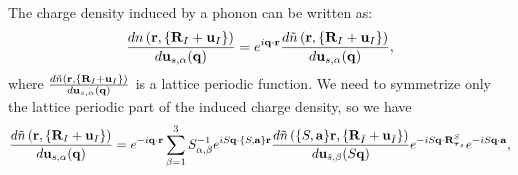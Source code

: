 \documentclass[12pt,a4paper,twoside]{report}
\begin{document}
The charge density induced by a phonon can be written as:
\begin{equation}
{d n\left({\bf r}, \{{\bf R}_I + {\bf u}_I\}\right)
\over d {\bf u}_{s,\alpha}({\bf q})} = 
e^{i {\bf q} \cdot {\bf r}} {d \tilde n\left({\bf r}, \{{\bf R}_I + {\bf u}_I\}\right)
\over d {\bf u}_{s,\alpha}({\bf q})},
\end{equation}
where ${d \tilde n\left({\bf r}, \{{\bf R}_I + {\bf u}_I\}\right)
\over d {\bf u}_{s,\alpha}({\bf q})}$ is a lattice periodic function.
We need to symmetrize only the lattice periodic
part of the induced charge density, so we have
\begin{equation}
{d \tilde n\left({\bf r}, \{{\bf R}_I + {\bf u}_I\}\right)
\over d {\bf u}_{s,\alpha}({\bf q})} = e^{-i{\bf q \cdot {\bf r }}} \sum_{\beta=1}^3 S^{-1}_{\alpha,\beta} 
e^{i S {\bf q} \cdot \{S,{\bf a}\} {\bf r }}
{d \tilde n\left(\{S,{\bf a}\} {\bf r}, \{{\bf R}_{\bar I} + {\bf u}_{\bar I}\}\right)
\over d {\bf u}_{\bar s,\beta} (S{\bf q})} e^{-iS{\bf q}\cdot {\bf R}^S_{{\boldsymbol{\tau}_s}}} e^{-iS{\bf q}\cdot {\bf a}},
\label{induced_charge}
\end{equation}
\end{document}

